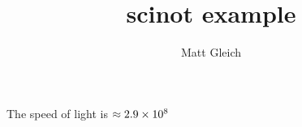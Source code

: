\documentclass{report}
\title{scinot example}
\author{Matt Gleich}
\date{}
\begin{document}
    \maketitle

    The speed of light is $ \approx 2.9 \times 10^{8} $
\end{document}
